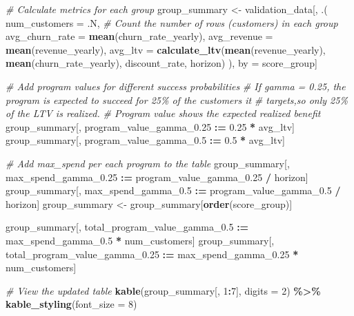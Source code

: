 \documentclass[
]{article}
\newenvironment{Shaded}{\begin{snugshade}}{\end{snugshade}}
\newcommand{\AttributeTok}[1]{\textcolor[rgb]{0.13,0.29,0.53}{#1}}
\newcommand{\CommentTok}[1]{\textcolor[rgb]{0.56,0.35,0.01}{\textit{#1}}}
\newcommand{\DecValTok}[1]{\textcolor[rgb]{0.00,0.00,0.81}{#1}}
\newcommand{\FloatTok}[1]{\textcolor[rgb]{0.00,0.00,0.81}{#1}}
\newcommand{\FunctionTok}[1]{\textcolor[rgb]{0.13,0.29,0.53}{\textbf{#1}}}
\newcommand{\NormalTok}[1]{#1}
\newcommand{\OtherTok}[1]{\textcolor[rgb]{0.56,0.35,0.01}{#1}}
\newcommand{\SpecialCharTok}[1]{\textcolor[rgb]{0.81,0.36,0.00}{\textbf{#1}}}
\begin{document}
\begin{Shaded}
\begin{Highlighting}[]
\CommentTok{\# Calculate metrics for each group}
\NormalTok{group\_summary }\OtherTok{\textless{}{-}}\NormalTok{ validation\_data[, .(}
  \AttributeTok{num\_customers =}\NormalTok{ .N,  }\CommentTok{\# Count the number of rows (customers) in each group}
  \AttributeTok{avg\_churn\_rate =} \FunctionTok{mean}\NormalTok{(churn\_rate\_yearly),}
  \AttributeTok{avg\_revenue =} \FunctionTok{mean}\NormalTok{(revenue\_yearly),}
  \AttributeTok{avg\_ltv =} \FunctionTok{calculate\_ltv}\NormalTok{(}\FunctionTok{mean}\NormalTok{(revenue\_yearly), }\FunctionTok{mean}\NormalTok{(churn\_rate\_yearly), }
\NormalTok{                          discount\_rate, horizon)}
\NormalTok{  ), by }\OtherTok{=}\NormalTok{ score\_group]}

\CommentTok{\# Add program values for different success probabilities}
\CommentTok{\# If gamma = 0.25, the program is expected to succeed for 25\% of the customers it }
\CommentTok{\# targets,so only 25\% of the LTV is realized.}
\CommentTok{\# Program value shows the expected realized benefit}
\NormalTok{group\_summary[, program\_value\_gamma\_0}\FloatTok{.25} \SpecialCharTok{:=} \FloatTok{0.25} \SpecialCharTok{*}\NormalTok{ avg\_ltv]}
\NormalTok{group\_summary[, program\_value\_gamma\_0}\FloatTok{.5} \SpecialCharTok{:=} \FloatTok{0.5} \SpecialCharTok{*}\NormalTok{ avg\_ltv]}

\CommentTok{\# Add max\_spend per each program to the table}
\NormalTok{group\_summary[, max\_spend\_gamma\_0}\FloatTok{.25} \SpecialCharTok{:=}\NormalTok{ program\_value\_gamma\_0}\FloatTok{.25} \SpecialCharTok{/}\NormalTok{ horizon]}
\NormalTok{group\_summary[, max\_spend\_gamma\_0}\FloatTok{.5} \SpecialCharTok{:=}\NormalTok{ program\_value\_gamma\_0}\FloatTok{.5} \SpecialCharTok{/}\NormalTok{ horizon]}
\NormalTok{group\_summary }\OtherTok{\textless{}{-}}\NormalTok{ group\_summary[}\FunctionTok{order}\NormalTok{(score\_group)]}

\NormalTok{group\_summary[, total\_program\_value\_gamma\_0}\FloatTok{.5} \SpecialCharTok{:=}\NormalTok{ max\_spend\_gamma\_0}\FloatTok{.5} \SpecialCharTok{*}\NormalTok{ num\_customers]}
\NormalTok{group\_summary[, total\_program\_value\_gamma\_0}\FloatTok{.25} \SpecialCharTok{:=}\NormalTok{ max\_spend\_gamma\_0}\FloatTok{.25} \SpecialCharTok{*}\NormalTok{ num\_customers]}

\CommentTok{\# View the updated table}
\FunctionTok{kable}\NormalTok{(group\_summary[, }\DecValTok{1}\SpecialCharTok{:}\DecValTok{7}\NormalTok{], }\AttributeTok{digits =} \DecValTok{2}\NormalTok{) }\SpecialCharTok{\%\textgreater{}\%}
  \FunctionTok{kable\_styling}\NormalTok{(}\AttributeTok{font\_size =} \DecValTok{8}\NormalTok{) }
\end{Highlighting}
\end{Shaded}
\end{document}
